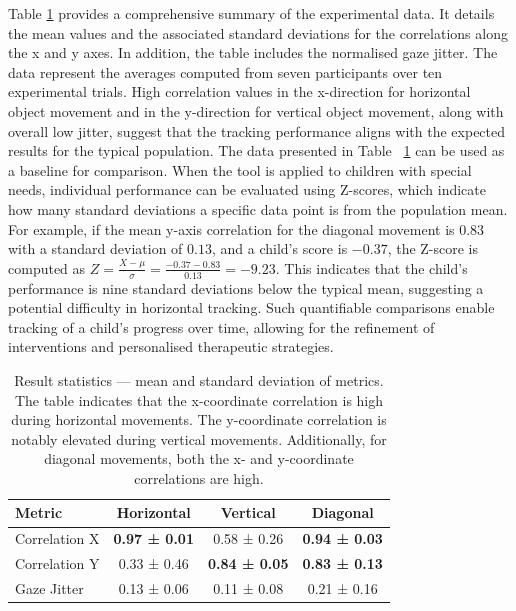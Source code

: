 \documentclass[10pt,a4paper,twoside]{article}
\begin{document}
Table \ref{metr} provides a comprehensive summary of the experimental data. It details the mean values and the associated standard deviations for the correlations along the x and y axes. In addition, the table includes the normalised gaze jitter. The data represent the averages computed from seven participants over ten experimental trials. High correlation values in the x-direction for horizontal object movement and in the y-direction for vertical object movement, along with overall low jitter, suggest that the tracking performance aligns with the expected results for the typical population. The data presented in Table ~\ref{metr} can be used as a baseline for comparison. When the tool is applied to children with special needs, individual performance can be evaluated using Z-scores, which indicate how many standard deviations a specific data point is from the population mean. For example, if the mean y-axis correlation for the diagonal movement is $0.83$ with a standard deviation of $0.13$, and a child’s score is $-0.37$, the Z-score is computed as \( Z = \frac{X - \mu}{\sigma} = \frac{-0.37 - 0.83}{0.13} = -9.23 \). This indicates that the child’s performance is nine standard deviations below the typical mean, suggesting a potential difficulty in horizontal tracking. Such quantifiable comparisons enable tracking of a child’s progress over time, allowing for the refinement of interventions and personalised therapeutic strategies.

\begin{table}[h!]
    \centering
    \begin{tabular}{lccc}
        \toprule
        Metric & Horizontal & Vertical & Diagonal \\
        \midrule
        Correlation X & \textbf{0.97 ± 0.01} & 0.58 ± 0.26 & \textbf{0.94 ± 0.03}\\
        Correlation Y & 0.33 ± 0.46 & \textbf{0.84 ± 0.05} & \textbf{0.83 ± 0.13}\\
        Gaze Jitter & 0.13 ± 0.06 & 0.11 ± 0.08 & 0.21 ± 0.16 \\
        \bottomrule
    \end{tabular}
     \caption{Result statistics — mean and standard deviation of metrics. The table indicates that the x-coordinate correlation is high during horizontal movements. The y-coordinate correlation is notably elevated during vertical movements. Additionally, for diagonal movements, both the x- and y-coordinate correlations are high.}
      \label{metr}
\end{table}
\end{document}
